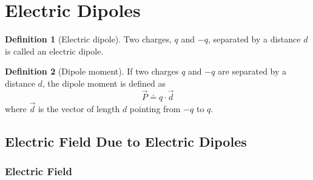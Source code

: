 \documentclass[fleqn, a4paper, 12pt, twoside]{article}
\theoremstyle{definition}
\newtheorem{definition}{Definition}
\theoremstyle{theorem}
\begin{document}
\section{Electric Dipoles}

\begin{definition}[Electric dipole]
	Two charges, $q$ and $-q$, separated by a distance $d$ is called an electric dipole.
	\begin{figure}[H]
	\end{figure}
\end{definition}

\begin{definition}[Dipole moment]
	If two charges $q$ and $-q$ are separated by a distance $d$, the dipole moment is defined as
	\begin{equation*}
		\overrightarrow{P} \doteq q \cdot \overrightarrow{d}
	\end{equation*}
	where $\overrightarrow{d}$ is the vector of length $d$ pointing from $-q$ to $q$.
\end{definition}

\subsection{Electric Field Due to Electric Dipoles}

\subsubsection{Electric Field}
\end{document}
